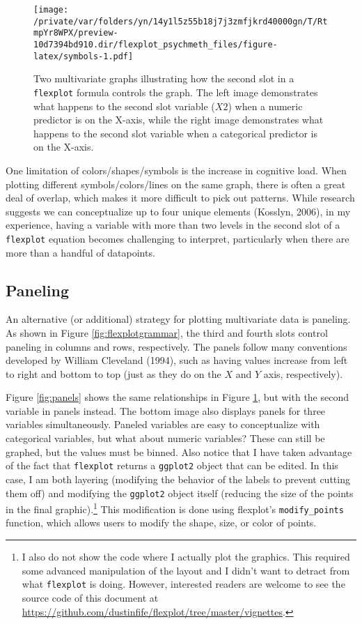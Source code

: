 \documentclass[
  english,
  man]{apa6}
\begin{document}
\begin{figure}
\centering
\texttt{[image: /private/var/folders/yn/14y1l5z55b18j7j3zmfjkrd40000gn/T/RtmpYr8WPX/preview-10d7394bd910.dir/flexplot\_psychmeth\_files/figure-latex/symbols-1.pdf]}
\caption{\label{fig:symbols}Two multivariate graphs illustrating how the second slot in a \texttt{flexplot} formula controls the graph. The left image demonstrates what happens to the second slot variable (\(X2\)) when a numeric predictor is on the X-axis, while the right image demonstrates what happens to the second slot variable when a categorical predictor is on the X-axis.}
\end{figure}

\normalsize

One limitation of colors/shapes/symbols is the increase in cognitive load. When plotting different symbols/colors/lines on the same graph, there is often a great deal of overlap, which makes it more difficult to pick out patterns. While research suggests we can conceptualize up to four unique elements (Kosslyn, 2006), in my experience, having a variable with more than two levels in the second slot of a \texttt{flexplot} equation becomes challenging to interpret, particularly when there are more than a handful of datapoints.

\hypertarget{paneling}{%
\subsection{Paneling}\label{paneling}}

An alternative (or additional) strategy for plotting multivariate data is paneling. As shown in Figure \ref{fig:flexplotgrammar}, the third and fourth slots control paneling in columns and rows, respectively. The panels follow many conventions developed by William Cleveland (1994), such as having values increase from left to right and bottom to top (just as they do on the \(X\) and \(Y\) axis, respectively).

Figure \ref{fig:panels} shows the same relationships in Figure \ref{fig:symbols}, but with the second variable in panels instead. The bottom image also displays panels for three variables simultaneously. Paneled variables are easy to conceptualize with categorical variables, but what about numeric variables? These can still be graphed, but the values must be binned. Also notice that I have taken advantage of the fact that \texttt{flexplot} returns a \texttt{ggplot2} object that can be edited. In this case, I am both layering (modifying the behavior of the labels to prevent cutting them off) and modifying the \texttt{ggplot2} object itself (reducing the size of the points in the final graphic).\footnote{I also do not show the code where I actually plot the graphics. This required some advanced manipulation of the layout and I didn't want to detract from what \texttt{flexplot} is doing. However, interested readers are welcome to see the source code of this document at \url{https://github.com/dustinfife/flexplot/tree/master/vignettes}.} This modification is done using flexplot's \texttt{modify\_points} function, which allows users to modify the shape, size, or color of points.
\end{document}
